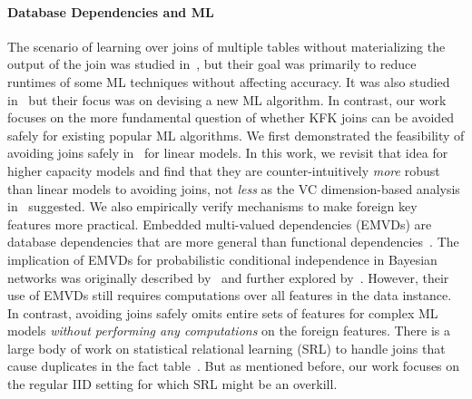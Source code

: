 \documentclass{vldb}
\begin{document}
\paragraph*{Database Dependencies and ML}
The scenario of learning over joins of multiple tables without materializing the output of the join was studied in~\cite{orion,olteanuf,rendle,santoku},
but their goal was primarily to reduce runtimes of some ML techniques without affecting accuracy. It was also studied in~\cite{crossmine} but their
focus was on devising a new ML algorithm. In contrast, our work focuses on the more fundamental question of whether KFK joins can be avoided safely for 
existing popular ML algorithms. We first demonstrated the feasibility of avoiding joins safely in~\cite{hamlet} for linear models. In this work, we revisit that 
idea for higher capacity models and find that they are counter-intuitively \textit{more} robust than linear models to avoiding joins, not \textit{less} as the 
VC dimension-based analysis in~\cite{hamlet} suggested. We also empirically verify mechanisms to make foreign key features more practical.
Embedded multi-valued dependencies (EMVDs) are database dependencies that are more general than functional dependencies~\cite{dbtheorybook}. 
The implication of EMVDs for probabilistic conditional independence in Bayesian networks was originally described by~\cite{pearl} and further explored by~\cite{wong}.
However, their use of EMVDs still requires computations over all features in the data instance. In contrast, avoiding joins safely omits entire sets 
of features for complex ML models \textit{without performing any computations} on the foreign features.
There is a large body of work on statistical relational learning (SRL) to handle joins that cause duplicates in the fact table~\cite{srlbook}. But as mentioned before, 
our work focuses on the regular IID setting for which SRL might be an overkill.
\end{document}
